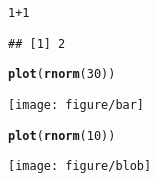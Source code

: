 \documentclass[a4paper]{article}\usepackage{graphicx, color}
\makeatletter
\def\maxwidth{ %
  \ifdim\Gin@nat@width>\linewidth
    \linewidth
  \else
    \Gin@nat@width
  \fi
}
\newcommand{\hlfunctioncall}[1]{\textcolor[rgb]{0.501960784313725,0,0.329411764705882}{\textbf{#1}}}%
\newenvironment{kframe}{%
 \def\at@end@of@kframe{}%
 \ifinner\ifhmode%
  \def\at@end@of@kframe{\end{minipage}}%
  \begin{minipage}{\columnwidth}%
 \fi\fi%
 \def\FrameCommand##1{\hskip\@totalleftmargin \hskip-\fboxsep
 \colorbox{shadecolor}{##1}\hskip-\fboxsep
     \hskip-\linewidth \hskip-\@totalleftmargin \hskip\columnwidth}%
 \MakeFramed {\advance\hsize-\width
   \@totalleftmargin\z@ \linewidth\hsize
   \@setminipage}}%
 {\par\unskip\endMakeFramed%
 \at@end@of@kframe}
\newenvironment{knitrout}{}{} %
\makeatother
\begin{document}
\begin{knitrout}
\color{fgcolor}\begin{kframe}
\begin{alltt}
1 + 1
\end{alltt}
\begin{verbatim}
## [1] 2
\end{verbatim}
\begin{alltt}
\hlfunctioncall{plot}(\hlfunctioncall{rnorm}(30))
\end{alltt}
\end{kframe}
\texttt{[image: figure/bar]} 

\end{knitrout}


\begin{knitrout}
\color{fgcolor}\begin{kframe}
\begin{alltt}
\hlfunctioncall{plot}(\hlfunctioncall{rnorm}(10))
\end{alltt}
\end{kframe}
\texttt{[image: figure/blob]} 

\end{knitrout}



%
%

%
%
%
%
%
%
%
%
%

%
%
\end{document}
